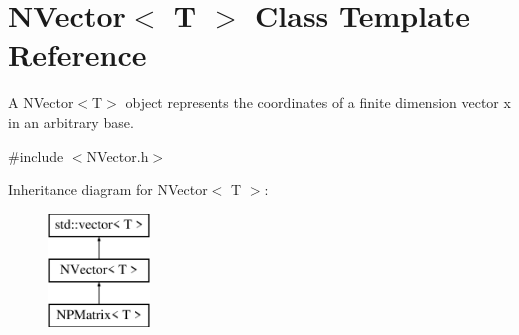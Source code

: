 \hypertarget{class_n_vector}{}\section{N\+Vector$<$ T $>$ Class Template Reference}
\label{class_n_vector}


A N\+Vector$<$\+T$>$ object represents the coordinates of a finite dimension vector x in an arbitrary base.  




{\ttfamily \#include $<$N\+Vector.\+h$>$}

Inheritance diagram for N\+Vector$<$ T $>$\+:\begin{figure}[H]
\begin{center}
\leavevmode
\includegraphics[height=3.000000cm]{class_n_vector}
\end{center}
\end{figure}

